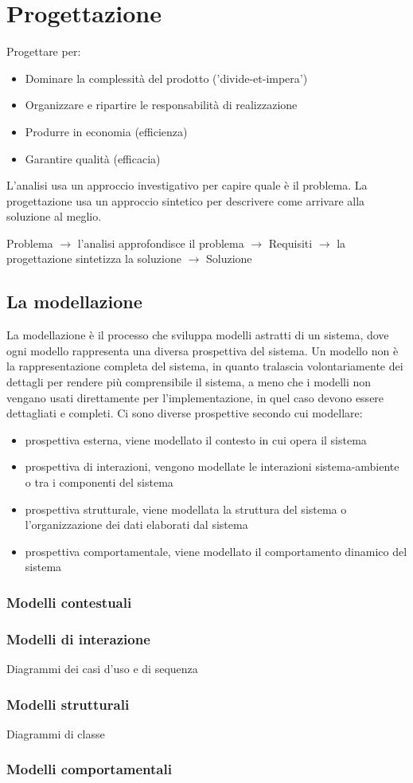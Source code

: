 \chapter{Progettazione}

Progettare per:
\begin{itemize}
\item Dominare la complessità del prodotto ('divide-et-impera')
\item Organizzare e ripartire le responsabilità di realizzazione
\item Produrre in economia (efficienza)
\item Garantire qualità (efficacia)
\end{itemize}


L'analisi usa un approccio investigativo per capire quale è il problema.
La progettazione usa un approccio sintetico per descrivere come arrivare alla soluzione al meglio.

Problema $\to$ l'analisi approfondisce il problema $\to$ Requisiti $\to$ la progettazione sintetizza la soluzione $\to$ Soluzione

\section{La modellazione}

La modellazione è il processo che sviluppa modelli astratti di un sistema, dove ogni modello rappresenta una diversa prospettiva del sistema.
Un modello non è la rappresentazione completa del sistema, in quanto tralascia volontariamente dei dettagli per rendere più comprensibile il sistema, a meno che i modelli non vengano usati direttamente per l'implementazione, in quel caso devono essere dettagliati e completi.
Ci sono diverse prospettive secondo cui modellare:
\begin{itemize}
\item prospettiva esterna, viene modellato il contesto in cui opera il sistema
\item prospettiva di interazioni, vengono modellate le interazioni sistema-ambiente o tra i componenti del sistema
\item prospettiva strutturale, viene modellata la struttura del sistema o l'organizzazione dei dati elaborati dal sistema
\item prospettiva comportamentale, viene modellato il comportamento dinamico del sistema
\end{itemize}

\subsection{Modelli contestuali}


\subsection{Modelli di interazione}

Diagrammi dei casi d'uso e di sequenza

\subsection{Modelli strutturali}

Diagrammi di classe 

\subsection{Modelli comportamentali}

